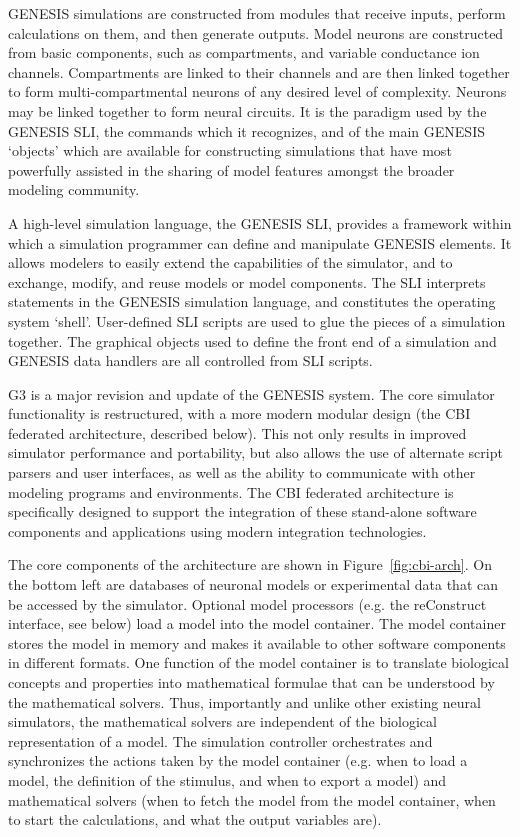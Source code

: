 \documentclass[12pt]{article}
\begin{document}
GENESIS simulations are constructed from modules that receive inputs,
perform calculations on them, and then generate outputs. Model neurons
are constructed from basic components, such as compartments, and
variable conductance ion channels. Compartments are linked to their
channels and are then linked together to form multi-compartmental
neurons of any desired level of complexity. Neurons may be linked
together to form neural circuits.  It is the paradigm used by the
GENESIS SLI, the commands which it recognizes, and of the main GENESIS
`objects' which are available for constructing simulations that have
most powerfully assisted in the sharing of model features amongst the
broader modeling community.

A high-level simulation language, the GENESIS SLI, provides a
framework within which a simulation programmer can define and
manipulate GENESIS elements. It allows modelers to easily extend the
capabilities of the simulator, and to exchange, modify, and reuse
models or model components. The SLI interprets statements in the
GENESIS simulation language, and constitutes the operating system
`shell'. User-defined SLI scripts are used to glue the pieces of a
simulation together. The graphical objects used to define the front
end of a simulation and GENESIS data handlers are all controlled from
SLI scripts.

G3 is a major revision and update of the GENESIS system.  The core
simulator functionality is restructured, with a more modern modular
design (the CBI federated architecture, described below). This not
only results in improved simulator performance and portability, but
also allows the use of alternate script parsers and user interfaces,
as well as the ability to communicate with other modeling programs and
environments. The CBI federated architecture is specifically designed
to support the integration of these stand-alone software components
and applications using modern integration technologies.

The core components of the architecture are shown in
Figure~\ref{fig:cbi-arch}. On the bottom left are databases of
neuronal models or experimental data that can be accessed by the
simulator. Optional model processors (e.g. the reConstruct interface,
see below) load a model into the model container.  The model container
stores the model in memory and makes it available to other software
components in different formats.  One function of the model container
is to translate biological concepts and properties into mathematical
formulae that can be understood by the mathematical solvers. Thus,
importantly and unlike other existing neural simulators, the
mathematical solvers are independent of the biological representation
of a model. The simulation controller orchestrates and synchronizes
the actions taken by the model container (e.g. when to load a model,
the definition of the stimulus, and when to export a model) and
mathematical solvers (when to fetch the model from the model
container, when to start the calculations, and what the output
variables are).
\end{document}
